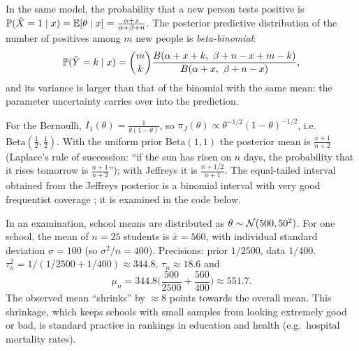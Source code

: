 \documentclass[main.tex]{subfiles}
\begin{document}
\begin{example}
In the same model, the probability that a new person tests positive is $\mathbb{P}(\tilde X=1\mid x)=\mathbb{E}[\theta\mid x]=\frac{\alpha+x}{\alpha+\beta+n}$. The posterior predictive distribution of the number of positives among $m$ new people is \emph{beta-binomial}:
\[
\P(\tilde Y=k\mid x)=\binom mk\frac{B(\alpha+x+k,\ \beta+n-x+m-k)}{B(\alpha+x,\ \beta+n-x)},
\]
and its variance is larger than that of the binomial with the same mean: the parameter uncertainty carries over into the prediction.
\end{example}

\begin{example}
For the Bernoulli, $I_1(\theta)=\frac{1}{\theta(1-\theta)}$, so $\pi_J(\theta)\propto\theta^{-1/2}(1-\theta)^{-1/2}$, i.e.\ $\text{Beta}(\frac12,\frac12)$. With the uniform prior $\text{Beta}(1,1)$ the posterior mean is $\frac{x+1}{n+2}$ (Laplace's rule of succession: ``if the sun has risen on $n$ days, the probability that it rises tomorrow is $\frac{n+1}{n+2}$''); with Jeffreys it is $\frac{x+1/2}{n+1}$. The equal-tailed interval obtained from the Jeffreys posterior is a binomial interval with very good frequentist coverage \cite{brown-cai}; it is examined in the code below.
\end{example}

\begin{example}
In an examination, school means are distributed as $\theta\sim\mathcal{N}(500,50^2)$. For one school, the mean of $n=25$ students is $\bar x=560$, with individual standard deviation $\sigma=100$ (so $\sigma^2/n=400$). Precisions: prior $1/2500$, data $1/400$. $\tau_n^2=1/(1/2500+1/400)\approx344.8$, $\tau_n\approx18.6$ and
\[
\mu_n=344.8\Big(\frac{500}{2500}+\frac{560}{400}\Big)\approx551.7 .
\]
The observed mean ``shrinks'' by $\approx8$ points towards the overall mean. This shrinkage, which keeps schools with small samples from looking extremely good or bad, is standard practice in rankings in education and health (e.g.\ hospital mortality rates).
\end{example}
\end{document}
